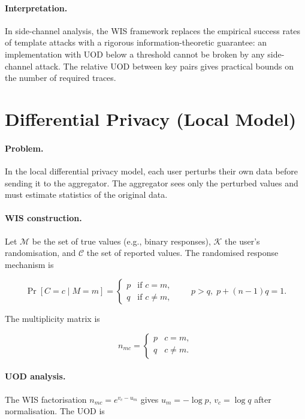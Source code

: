 \paragraph{Interpretation.}
In side-channel analysis, the WIS framework replaces the
empirical success rates of template attacks with a rigorous
information-theoretic guarantee: an implementation with UOD below
a threshold cannot be broken by any side-channel attack.  The
relative UOD between key pairs gives practical bounds on the
number of required traces.

\section{Differential Privacy (Local Model)}\label{ch:sec:differential-privacy-and-database-queries-local-model}
\label{sec:app-local-dp}

\paragraph{Problem.}
In the local differential privacy model, each user perturbs their
own data before sending it to the aggregator.  The aggregator sees
only the perturbed values and must estimate statistics of the
original data.

\paragraph{WIS construction.}
Let $\mathcal M$ be the set of true values (e.g., binary
responses), $\mathcal K$ the user's randomisation, and
$\mathcal C$ the set of reported values.  The randomised response
mechanism is

\[
\Pr[C=c\mid M=m] = \begin{cases}
p & \text{if } c=m,\\
q & \text{if } c\neq m,
\end{cases}
\qquad p>q,\; p+(n-1)q=1.
\]

The multiplicity matrix is

\[
n_{mc} = \begin{cases}
p & c=m,\\
q & c\neq m.
\end{cases}
\]

\paragraph{UOD analysis.}
The WIS factorisation $n_{mc}=e^{v_c-u_m}$ gives
$u_m=-\log p$, $v_c=\log q$ after normalisation.  The UOD is

